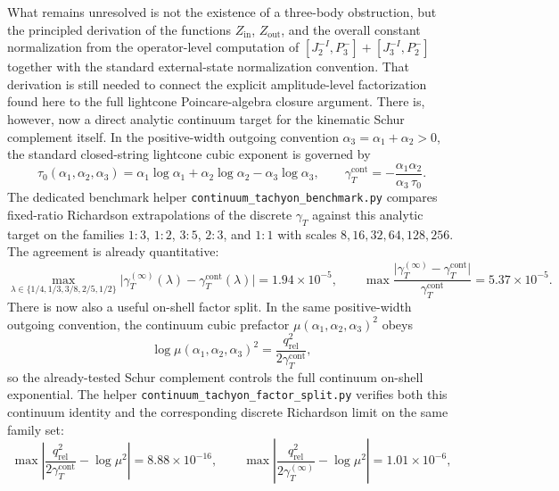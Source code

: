 \documentclass[11pt]{article}
\numberwithin{equation}{section}
\begin{document}
What remains unresolved is not the existence of a three-body obstruction, but the principled derivation of the functions $Z_{\mathrm{in}}$, $Z_{\mathrm{out}}$, and the overall constant normalization from the operator-level computation of $[J^{-I}_2,P^-_3]+[J^{-I}_3,P^-_2]$ together with the standard external-state normalization convention. That derivation is still needed to connect the explicit amplitude-level factorization found here to the full lightcone Poincare-algebra closure argument.
There is, however, now a direct analytic continuum target for the kinematic Schur complement itself. In the positive-width outgoing convention $\alpha_3=\alpha_1+\alpha_2>0$, the standard closed-string lightcone cubic exponent is governed by
\begin{equation}
\label{eq:s12-1-045}
\tau_0(\alpha_1,\alpha_2,\alpha_3)
=
\alpha_1\log \alpha_1+\alpha_2\log \alpha_2-\alpha_3\log \alpha_3,
\qquad
\gamma_T^{\mathrm{cont}}
=
-\frac{\alpha_1\alpha_2}{\alpha_3\,\tau_0}.
\end{equation}
The dedicated benchmark helper \texttt{continuum\_tachyon\_benchmark.py} compares fixed-ratio Richardson extrapolations of the discrete $\gamma_T$ against this analytic target on the families $1\!:\!3$, $1\!:\!2$, $3\!:\!5$, $2\!:\!3$, and $1\!:\!1$ with scales $8,16,32,64,128,256$. The agreement is already quantitative:
\begin{equation}
\label{eq:s12-1-046}
\max_{\lambda\in\{1/4,1/3,3/8,2/5,1/2\}}
\bigl|\gamma_T^{(\infty)}(\lambda)-\gamma_T^{\mathrm{cont}}(\lambda)\bigr|
=1.94\times 10^{-5},
\qquad
\max
\frac{\bigl|\gamma_T^{(\infty)}-\gamma_T^{\mathrm{cont}}\bigr|}{\gamma_T^{\mathrm{cont}}}
=5.37\times 10^{-5}.
\end{equation}
There is now also a useful on-shell factor split. In the same positive-width outgoing convention, the continuum cubic prefactor $\mu(\alpha_1,\alpha_2,\alpha_3)^2$ obeys
\begin{equation}
\label{eq:s12-1-046a}
\log \mu(\alpha_1,\alpha_2,\alpha_3)^2
=
\frac{q_{\mathrm{rel}}^2}{2\gamma_T^{\mathrm{cont}}},
\end{equation}
so the already-tested Schur complement controls the full continuum on-shell exponential. The helper \texttt{continuum\_tachyon\_factor\_split.py} verifies both this continuum identity and the corresponding discrete Richardson limit on the same family set:
\begin{equation}
\label{eq:s12-1-046b}
\max
\left|
\frac{q_{\mathrm{rel}}^2}{2\gamma_T^{\mathrm{cont}}}
-\log\mu^2
\right|
=8.88\times 10^{-16},
\qquad
\max
\left|
\frac{q_{\mathrm{rel}}^2}{2\gamma_T^{(\infty)}}
-\log\mu^2
\right|
=1.01\times 10^{-6},
\end{equation}
\end{document}
